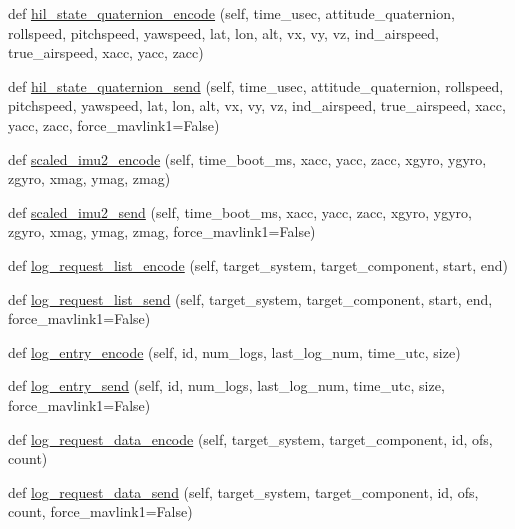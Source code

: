 \begin{DoxyCompactItemize}
\item 
def \hyperlink{classpymavlink_1_1dialects_1_1v10_1_1MAVLink_a2e785283adb3de116ca65f95b6876eab}{hil\+\_\+state\+\_\+quaternion\+\_\+encode} (self, time\+\_\+usec, attitude\+\_\+quaternion, rollspeed, pitchspeed, yawspeed, lat, lon, alt, vx, vy, vz, ind\+\_\+airspeed, true\+\_\+airspeed, xacc, yacc, zacc)
\item 
def \hyperlink{classpymavlink_1_1dialects_1_1v10_1_1MAVLink_a0053e5633c3190cb376281e785157446}{hil\+\_\+state\+\_\+quaternion\+\_\+send} (self, time\+\_\+usec, attitude\+\_\+quaternion, rollspeed, pitchspeed, yawspeed, lat, lon, alt, vx, vy, vz, ind\+\_\+airspeed, true\+\_\+airspeed, xacc, yacc, zacc, force\+\_\+mavlink1=False)
\item 
def \hyperlink{classpymavlink_1_1dialects_1_1v10_1_1MAVLink_ad540f221c03a5a6a7fff58f04c8d455c}{scaled\+\_\+imu2\+\_\+encode} (self, time\+\_\+boot\+\_\+ms, xacc, yacc, zacc, xgyro, ygyro, zgyro, xmag, ymag, zmag)
\item 
def \hyperlink{classpymavlink_1_1dialects_1_1v10_1_1MAVLink_a8409dbaadf7858ccbcf6d36502b8e8c1}{scaled\+\_\+imu2\+\_\+send} (self, time\+\_\+boot\+\_\+ms, xacc, yacc, zacc, xgyro, ygyro, zgyro, xmag, ymag, zmag, force\+\_\+mavlink1=False)
\item 
def \hyperlink{classpymavlink_1_1dialects_1_1v10_1_1MAVLink_ac995ae19b2768eaa61bb3735eabb122b}{log\+\_\+request\+\_\+list\+\_\+encode} (self, target\+\_\+system, target\+\_\+component, start, end)
\item 
def \hyperlink{classpymavlink_1_1dialects_1_1v10_1_1MAVLink_a261367041ce62eec9eb1cd9b02b7ff7f}{log\+\_\+request\+\_\+list\+\_\+send} (self, target\+\_\+system, target\+\_\+component, start, end, force\+\_\+mavlink1=False)
\item 
def \hyperlink{classpymavlink_1_1dialects_1_1v10_1_1MAVLink_aa4d2b903c1a43469840c70c11c959d2a}{log\+\_\+entry\+\_\+encode} (self, id, num\+\_\+logs, last\+\_\+log\+\_\+num, time\+\_\+utc, size)
\item 
def \hyperlink{classpymavlink_1_1dialects_1_1v10_1_1MAVLink_a6e1a9cb48a6d29843d547769af26d2d9}{log\+\_\+entry\+\_\+send} (self, id, num\+\_\+logs, last\+\_\+log\+\_\+num, time\+\_\+utc, size, force\+\_\+mavlink1=False)
\item 
def \hyperlink{classpymavlink_1_1dialects_1_1v10_1_1MAVLink_a6c1a49dcd47f45f14d361d7850b1980f}{log\+\_\+request\+\_\+data\+\_\+encode} (self, target\+\_\+system, target\+\_\+component, id, ofs, count)
\item 
def \hyperlink{classpymavlink_1_1dialects_1_1v10_1_1MAVLink_a982ed32b2e29a8c473073b962d93b615}{log\+\_\+request\+\_\+data\+\_\+send} (self, target\+\_\+system, target\+\_\+component, id, ofs, count, force\+\_\+mavlink1=False)

\end{DoxyCompactItemize}
